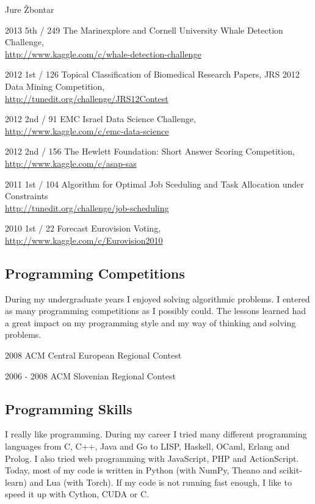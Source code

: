 \documentclass[12pt,a4paper]{article}
\begin{document}
\begin{cv}{Jure \v{Z}bontar}
\begin{cvlist}{}
\item[2013 \quad 5th / 249] The Marinexplore and Cornell University Whale Detection 
Challenge\footnotemark[1], \\
\url{http://www.kaggle.com/c/whale-detection-challenge}
\item[2012 \quad 1st / 126] Topical Classification of Biomedical Research Papers, 
JRS 2012 Data Mining Competition\footnotemark[2], \\
\url{http://tunedit.org/challenge/JRS12Contest}
\item[2012 \quad 2nd / 91] EMC Israel Data Science Challenge\footnotemark[2], \\
\url{http://www.kaggle.com/c/emc-data-science}
\item[2012 \quad 2nd / 156] The Hewlett Foundation: Short Answer Scoring 
Competition\footnotemark[1], \\
\url{http://www.kaggle.com/c/asap-sas}
\item[2011 \quad 1st / 104] Algorithm for Optimal Job Sceduling and Task 
Allocation under Constraints\footnotemark[1] \\
\url{http://tunedit.org/challenge/job-scheduling}
\item[2010 \quad 1st / 22] Forecast Eurovision Voting\footnotemark[1], \\
\url{http://www.kaggle.com/c/Eurovision2010}
\end{cvlist}

 
\subsection*{Programming Competitions}
During my undergraduate years I enjoyed solving algorithmic problems. I entered
as many programming competitions as I possibly could. The lessons learned
had a great impact on my programming style and my way of thinking and solving problems.

\begin{cvlist}{}
\item[2008] ACM Central European Regional Contest
\item[2006 - 2008] ACM Slovenian Regional Contest
\end{cvlist}

\subsection*{Programming Skills}
I really like programming. During my career I tried many different
programming languages from C, C++, Java and Go to LISP, Haskell, OCaml,
Erlang and Prolog. I also tried web programming with JavaScript, PHP and
ActionScript. Today, most of my code is written in Python (with NumPy,
Theano and scikit-learn) and Lua (with Torch). If my code is not running fast enough,
I like to speed it up with Cython, CUDA or C.

\end{cv}
\end{document}
